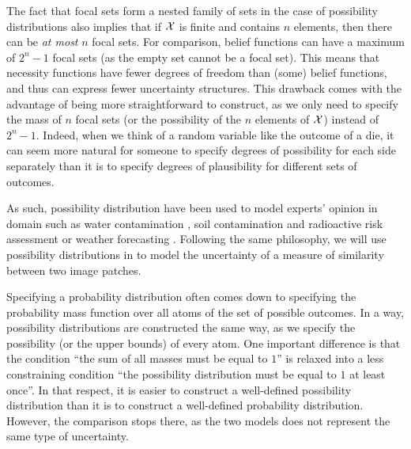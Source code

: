 \begin{remark}
    The fact that focal sets form a nested family of sets in the case of possibility distributions also implies that if $\mathcal{X}$ is finite and contains $n$ elements, then there can be \textit{at most} $n$ focal sets. For comparison, belief functions can have a maximum of $2^n-1$ focal sets (as the empty set cannot be a focal set). This means that necessity functions have fewer degrees of freedom than (some) belief functions, and thus can express fewer uncertainty structures. This drawback comes with the advantage of being more straightforward to construct, as we only need to specify the mass of $n$ focal sets (or the possibility of the $n$ elements of $\mathcal{X}$) instead of $2^n-1$. Indeed, when we think of a random variable like the outcome of a die, it can seem more natural for someone to specify degrees of possibility for each side separately than it is to specify degrees of plausibility for different sets of outcomes. 
    
    As such, possibility distribution have been used to model experts' opinion in domain such as water contamination \cite{bardossy_l-_1995}, soil contamination and radioactive risk assessment \cite{baudrit_comparing_2005,baudrit_representation_2005,baudrit_joint_2007} or weather forecasting \cite{le_carrer_beyond_2021}. Following the same philosophy, we will use possibility distributions in  to model the uncertainty of a measure of similarity between two image patches.
\end{remark}

Specifying a probability distribution often comes down to specifying the probability mass function over all atoms of the set of possible outcomes. In a way, possibility distributions are constructed the same way, as we specify the possibility (or the upper bounds) of every atom. One important difference is that the condition ``the sum of all masses must be equal to $1$'' is relaxed into a less constraining condition ``the possibility distribution must be equal to $1$ at least once''. In that respect, it is easier to construct a well-defined possibility distribution than it is to construct a well-defined probability distribution. However, the comparison stops there, as the two models does not represent the same type of uncertainty.

